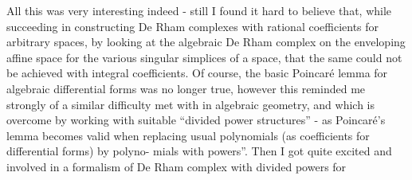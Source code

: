 All this  was very interesting indeed  -  still I found
it hard to believe that,  while succeeding in constructing De Rham 
complexes with rational coefficients for arbitrary spaces,  by looking
at the algebraic De Rham complex on the enveloping affine space for
the various singular simplices of a space,  that the same could not be
achieved with integral coefficients.  Of course,  the basic Poincaré
lemma for algebraic differential forms was no longer true,  however
this reminded  me strongly of a similar difficulty met with in algebraic
geometry,  and which is overcome by working with suitable ``divided
power structures''  -  as Poincaré's lemma becomes valid when replacing
usual polynomials (as coefficients for differential forms)  by polyno-%
mials with  powers''.  Then I got quite excited and involved in
 a formalism of De Rham complex with divided powers  for

